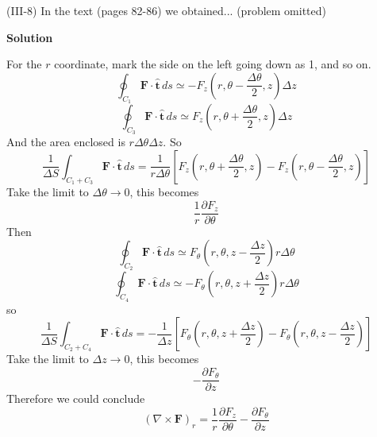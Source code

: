 \documentclass{article}
\begin{document}

\begin{homeworkProblem}
	(III-8) In the text (pages 82-86) we obtained... (problem omitted)

	\textbf{Solution}

	For the $r$ coordinate, mark the side on the left going down as 1, and so on.
	\[
		\oint_{C_1}\mathbf{F}\cdot\hat{\mathbf{t}}\,ds\simeq-F_z\left(r,\theta-\frac{\Delta\theta}{2},z\right)\Delta z
	\]
	\[
		\oint_{C_3}\mathbf{F}\cdot\hat{\mathbf{t}}\,ds\simeq F_z\left(r,\theta+\frac{\Delta\theta}{2},z\right)\Delta z
	\]
	And the area enclosed is $r\Delta\theta\Delta z$. So
	\[
		\frac{1}{\Delta S}\int_{C_1+C_3}\mathbf{F}\cdot\hat{\mathbf{t}}\,ds=\frac{1}{r\Delta\theta}\left[F_z\left(r,\theta+\frac{\Delta\theta}{2},z\right)-F_z\left(r,\theta-\frac{\Delta\theta}{2},z\right)\right]
	\]
	Take the limit to $\Delta\theta\rightarrow0$, this becomes
	\[
		\frac{1}{r}\frac{\partial F_z}{\partial\theta}
	\]
	Then
	\[
		\oint_{C_2}\mathbf{F}\cdot\hat{\mathbf{t}}\,ds\simeq F_\theta\left(r,\theta,z-\frac{\Delta z}{2}\right)r\Delta\theta
	\]
	\[
		\oint_{C_4}\mathbf{F}\cdot\hat{\mathbf{t}}\,ds\simeq-F_\theta\left(r,\theta,z+\frac{\Delta z}{2}\right)r\Delta\theta
	\]
	so
	\[
		\frac{1}{\Delta S}\int_{C_2+C_4}\mathbf{F}\cdot\hat{\mathbf{t}}\,ds=-\frac{1}{\Delta z}\left[F_\theta\left(r,\theta,z+\frac{\Delta z}{2}\right)-F_\theta\left(r,\theta,z-\frac{\Delta z}{2}\right)\right]
	\]
	Take the limit to $\Delta z\rightarrow0$, this becomes
	\[
		-\frac{\partial F_\theta}{\partial z}
	\]
	Therefore we could conclude
	\[
		(\nabla\times\mathbf{F})_r=\frac{1}{r}\frac{\partial F_z}{\partial\theta}-\frac{\partial F_\theta}{\partial z}
	\]


\end{homeworkProblem}
\end{document}
